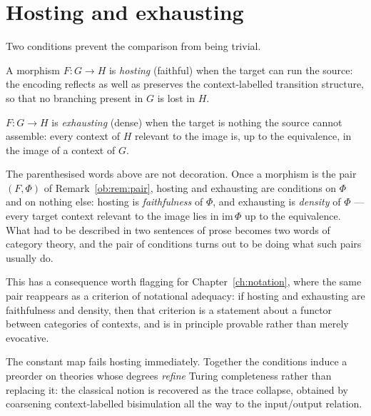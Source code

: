 \section{Hosting and exhausting}

Two conditions prevent the comparison from being trivial.

\begin{definition}[Hosting]
A morphism $F : G \to H$ is \emph{hosting} (faithful) when the target can run the
source: the encoding reflects as well as preserves the context-labelled transition
structure, so that no branching present in $G$ is lost in $H$.
\end{definition}

\begin{definition}[Exhausting]
$F : G \to H$ is \emph{exhausting} (dense) when the target is nothing the source cannot
assemble: every context of $H$ relevant to the image is, up to the equivalence, in the
image of a context of $G$.
\end{definition}

\begin{remark}
\label{ob:rem:faithdense}
The parenthesised words above are not decoration. Once a morphism is the pair
$(F,\Phi)$ of Remark~\ref{ob:rem:pair}, hosting and exhausting are conditions on
$\Phi$ and on nothing else: hosting is \emph{faithfulness} of $\Phi$, and
exhausting is \emph{density} of $\Phi$ --- every target context relevant to the
image lies in $\mathrm{im}\,\Phi$ up to the equivalence. What had to be described
in two sentences of prose becomes two words of category theory, and the pair of
conditions turns out to be doing what such pairs usually do.

This has a consequence worth flagging for Chapter~\ref{ch:notation}, where the
same pair reappears as a criterion of notational adequacy: if hosting and
exhausting are faithfulness and density, then that criterion is a statement about
a functor between categories of contexts, and is in principle provable rather than
merely evocative.
\end{remark}

The constant map fails hosting immediately. Together the conditions induce a preorder on
theories whose degrees \emph{refine} Turing completeness rather than replacing it: the
classical notion is recovered as the trace collapse, obtained by coarsening
context-labelled bisimulation all the way to the input/output relation.

